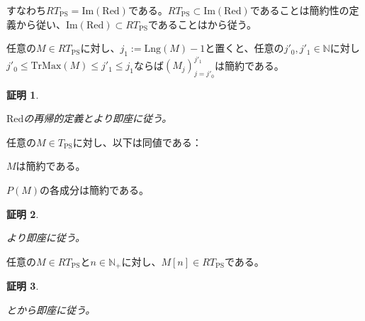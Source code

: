 \documentclass[dvipdfmx,uplatex]{jsarticle}
\theoremstyle{customnonumberbreakfortheorem}
\theoremstyle{customnonumberbreakforproof}
\newtheorem{hideableproof}{証明}
\begin{document}
すなわち\(RT_{\textrm{PS}} = \textrm{Im}(\textrm{Red})\)である。\(RT_{\textrm{PS}} \subset \textrm{Im}(\textrm{Red})\)であることは簡約性の定義から従い、\(\textrm{Im}(\textrm{Red}) \subset RT_{\textrm{PS}}\)であることはから従う。

\begin{proposition}[簡約性の切片への遺伝性]\label{簡約性の切片への遺伝性}
	任意の\(M \in RT_{\textrm{PS}}\)に対し、\(j_1 := \textrm{Lng}(M)-1\)と置くと、任意の\(j'_0,j'_1 \in \mathbb{N}\)に対し\(j'_0 \leq \textrm{TrMax}(M) \leq j'_1 \leq j_1\)ならば\((M_j)_{j=j'_0}^{j'_1}\)は簡約である。
\end{proposition}

\begin{hideableproof}
	\begin{indented}
		\item \(\textrm{Red}\)の再帰的定義とより即座に従う。
	\end{indented}
\end{hideableproof}

\begin{proposition}[\(P\)が簡約性を保つこと]\label{Pが簡約性を保つこと}
	任意の\(M \in T_{\textrm{PS}}\)に対し、以下は同値である：
	\begin{penumerate}
		\item \(M\)は簡約である。
		\item \(P(M)\)の各成分は簡約である。
	\end{penumerate}
\end{proposition}

\begin{hideableproof}
	\begin{indented}
		\item {}より即座に従う。
	\end{indented}
\end{hideableproof}

\begin{proposition}[簡約性が基本列で保たれること]\label{簡約性が基本列で保たれること}
	任意の\(M \in RT_{\textrm{PS}}\)と\(n \in \mathbb{N}_{+}\)に対し、\(M[n] \in RT_{\textrm{PS}}\)である。
\end{proposition}

\begin{hideableproof}
	\begin{indented}
		\item {}とから即座に従う。
	\end{indented}
\end{hideableproof}
\end{document}
